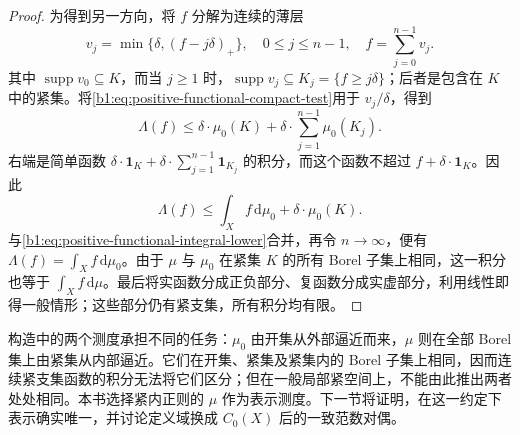 \begin{proof}
为得到另一方向，将 \(f\) 分解为连续的薄层
\[
 v_j=\min\bigl\{\delta,(f-j\delta)_+\bigr\},
 \quad 0\leq j\leq n-1,
 \quad f=\sum_{j=0}^{n-1}v_j.
\]
其中 \(\operatorname{supp}v_0\subseteq K\)，而当 \(j\geq1\) 时，\(\operatorname{supp}v_j\subseteq K_j=\{f\geq j\delta\}\)；后者是包含在 \(K\) 中的紧集。将\eqref{b1:eq:positive-functional-compact-test}用于 \(v_j/\delta\)，得到
\[
 \Lambda(f)\leq\delta\cdot\mu_0(K)
                 +\delta\cdot\sum_{j=1}^{n-1}\mu_0(K_j).
\]
右端是简单函数 \(\delta\cdot\mathbf1_K+\delta\cdot\sum_{j=1}^{n-1}\mathbf1_{K_j}\) 的积分，而这个函数不超过 \(f+\delta\cdot\mathbf1_K\)。因此
\[
 \Lambda(f)\leq\int_X f\,\mathrm d\mu_0+\delta\cdot\mu_0(K).
\]
与\eqref{b1:eq:positive-functional-integral-lower}合并，再令 \(n\rightarrow\infty\)，便有 \(\Lambda(f)=\int_X f\,\mathrm d\mu_0\)。由于 \(\mu\) 与 \(\mu_0\) 在紧集 \(K\) 的所有 Borel 子集上相同，这一积分也等于 \(\int_X f\,\mathrm d\mu\)。最后将实函数分成正负部分、复函数分成实虚部分，利用线性即得一般情形；这些部分仍有紧支集，所有积分均有限。
\end{proof}

构造中的两个测度承担不同的任务：\(\mu_0\) 由开集从外部逼近而来，\(\mu\) 则在全部 Borel 集上由紧集从内部逼近。它们在开集、紧集及紧集内的 Borel 子集上相同，因而连续紧支集函数的积分无法将它们区分；但在一般局部紧空间上，不能由此推出两者处处相同。本书选择紧内正则的 \(\mu\) 作为表示测度。下一节将证明，在这一约定下表示确实唯一，并讨论定义域换成 \(C_0(X)\) 后的一致范数对偶。
